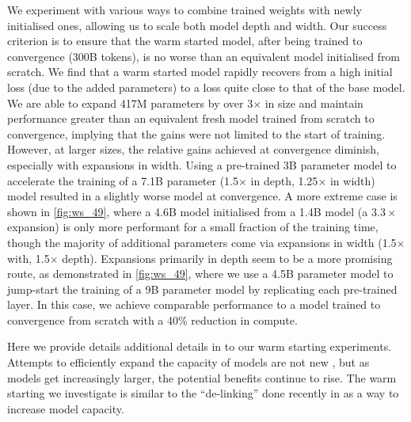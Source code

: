 \documentclass[11pt, a4paper, logo, internal, copyright, nonumbering]{deepmind}
\begin{document}
We experiment with various ways to combine trained weights with newly initialised ones, allowing us to scale both model depth and width.
Our success criterion is to ensure that the warm started model, after being trained to convergence (300B tokens), is no worse than an equivalent model initialised from scratch.
We find that a warm started model rapidly recovers from a high initial loss (due to the added parameters) to a loss quite close to that of the base model.
We are able to expand 417M parameters by over 3$\times$ in size and maintain performance greater than an equivalent fresh model trained from scratch to convergence, implying that the gains were not limited to the start of training.
However, at larger sizes, the relative gains achieved at convergence diminish, especially with expansions in width.
Using a pre-trained 3B parameter model to accelerate the training of a 7.1B parameter (1.5$
\times$ in depth, 1.25$\times$ in width) model resulted in a slightly worse model at convergence.
A more extreme case is shown in \autoref{fig:ws_49}, where a 4.6B model initialised from a 1.4B model (a $3.3\times$ expansion) is only more performant for a small fraction of the training time, though the majority of additional parameters come via expansions in width (1.5$\times$ with, 1.5$\times$ depth).  
Expansions primarily in depth seem to be a more promising route, as demonstrated in \autoref{fig:ws_49}, where we use a 4.5B parameter model to jump-start the training of a 9B parameter model by replicating each pre-trained layer. In this case, we achieve comparable performance to a model trained to convergence from scratch with a 40\% reduction in compute.


Here we provide details additional details in to our warm starting experiments. 
Attempts to efficiently expand the capacity of models are not new \citep{chen2015net2net}, but as models get increasingly larger, the potential benefits continue to rise.
The warm starting we investigate is similar to the ``de-linking'' done recently in \citet{lin2021m610t} as a way to increase model capacity.
\end{document}
